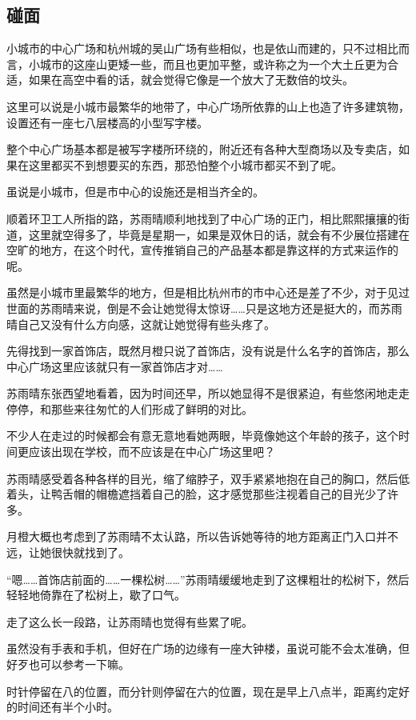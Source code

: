 \subsection{碰面}

小城市的中心广场和杭州城的吴山广场有些相似，也是依山而建的，只不过相比而言，小城市的这座山更矮一些，而且也更加平整，或许称之为一个大土丘更为合适，如果在高空中看的话，就会觉得它像是一个放大了无数倍的坟头。

这里可以说是小城市最繁华的地带了，中心广场所依靠的山上也造了许多建筑物，设置还有一座七八层楼高的小型写字楼。

整个中心广场基本都是被写字楼所环绕的，附近还有各种大型商场以及专卖店，如果在这里都买不到想要买的东西，那恐怕整个小城市都买不到了呢。

虽说是小城市，但是市中心的设施还是相当齐全的。

顺着环卫工人所指的路，苏雨晴顺利地找到了中心广场的正门，相比熙熙攘攘的街道，这里就空得多了，毕竟是星期一，如果是双休日的话，就会有不少展位搭建在空旷的地方，在这个时代，宣传推销自己的产品基本都是靠这样的方式来运作的呢。

虽然是小城市里最繁华的地方，但是相比杭州市的市中心还是差了不少，对于见过世面的苏雨晴来说，倒是不会让她觉得太惊讶……只是这地方还是挺大的，而苏雨晴自己又没有什么方向感，这就让她觉得有些头疼了。

先得找到一家首饰店，既然月橙只说了首饰店，没有说是什么名字的首饰店，那么中心广场这里应该就只有一家首饰店才对……

苏雨晴东张西望地看着，因为时间还早，所以她显得不是很紧迫，有些悠闲地走走停停，和那些来往匆忙的人们形成了鲜明的对比。

不少人在走过的时候都会有意无意地看她两眼，毕竟像她这个年龄的孩子，这个时间更应该出现在学校，而不应该是在中心广场这里吧？

苏雨晴感受着各种各样的目光，缩了缩脖子，双手紧紧地抱在自己的胸口，然后低着头，让鸭舌帽的帽檐遮挡着自己的脸，这才感觉那些注视着自己的目光少了许多。

月橙大概也考虑到了苏雨晴不太认路，所以告诉她等待的地方距离正门入口并不远，让她很快就找到了。

“嗯……首饰店前面的……一棵松树……”苏雨晴缓缓地走到了这棵粗壮的松树下，然后轻轻地倚靠在了松树上，歇了口气。

走了这么长一段路，让苏雨晴也觉得有些累了呢。

虽然没有手表和手机，但好在广场的边缘有一座大钟楼，虽说可能不会太准确，但好歹也可以参考一下嘛。

时针停留在八的位置，而分针则停留在六的位置，现在是早上八点半，距离约定好的时间还有半个小时。

